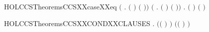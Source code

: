 \begin{SaveVerbatim}{HOLCCSTheoremsCCSXXcaseXXeq}
   \ensuremath{(}\HOLSymConst{\HOLTokenExists{}} . \ensuremath{(} \HOLSymConst{\ensuremath{=}}   \ensuremath{)} \HOLSymConst{\HOLTokenConj{}} \ensuremath{(}   \HOLSymConst{\ensuremath{=}} \ensuremath{)}\ensuremath{)} \HOLSymConst{\HOLTokenDisj{}}
   \ensuremath{(}\HOLSymConst{\HOLTokenExists{}} . \ensuremath{(} \HOLSymConst{\ensuremath{=}}   \ensuremath{)} \HOLSymConst{\HOLTokenConj{}} \ensuremath{(}   \HOLSymConst{\ensuremath{=}} \ensuremath{)}\ensuremath{)} \HOLSymConst{\HOLTokenDisj{}}
   \HOLSymConst{\HOLTokenExists{}} . \ensuremath{(} \HOLSymConst{\ensuremath{=}}   \ensuremath{)} \HOLSymConst{\HOLTokenConj{}} \ensuremath{(}   \HOLSymConst{\ensuremath{=}} \ensuremath{)}
\end{SaveVerbatim}
\newcommand{\HOLCCSTheoremsCCSXXcaseXXeq}{\UseVerbatim{HOLCCSTheoremsCCSXXcaseXXeq}}
\begin{SaveVerbatim}{HOLCCSTheoremsCCSXXCONDXXCLAUSES}
\HOLTokenTurnstile{} \HOLSymConst{\HOLTokenForall{}} .
       \ensuremath{(}\ensuremath{(}     \ensuremath{)} \HOLSymConst{\ensuremath{=}} \ensuremath{)} \HOLSymConst{\HOLTokenConj{}}
       \ensuremath{(}\ensuremath{(}     \ensuremath{)} \HOLSymConst{\ensuremath{=}} \ensuremath{)}
\end{SaveVerbatim}
\newcommand{\HOLCCSTheoremsCCSXXCONDXXCLAUSES}{\UseVerbatim{HOLCCSTheoremsCCSXXCONDXXCLAUSES}}
